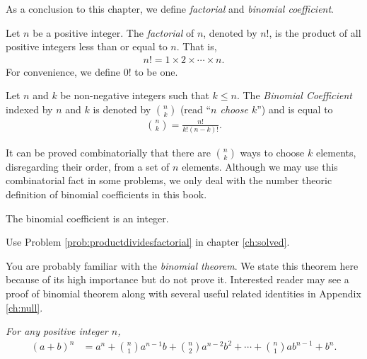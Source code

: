 \documentclass{subfile}
\begin{document}
As a conclusion to this chapter, we define \textit{factorial} and \textit{binomial coefficient}.

		\begin{definition}[Factorial]
			Let $n$ be a positive integer. The \textit{factorial} of $n$, denoted by $n!$, is the product of all positive integers less than or equal to $n$. That is,
				\begin{align*}
					n! = 1 \times 2 \times \cdots \times n.
				\end{align*}
			For convenience, we define $0!$ to be one.
		\end{definition}

		\begin{definition}
			Let $n$ and $k$ be non-negative integers such that $k \leq n$. The \textit{Binomial Coefficient} indexed by $n$ and $k$ is denoted by $\displaystyle \binom{n}{k}$ (read ``\textit{$n$ choose $k$}'') and is equal to
				\begin{align*}
					\binom{n}{k} = \frac{n!}{k!(n-k)!}.
				\end{align*}
		\end{definition}

		\begin{note}
			It can be proved combinatorially that there are $\binom{n}{k}$ ways to choose $k$ elements, disregarding their order, from a set of $n$ elements. Although we may use this combinatorial fact in some problems, we only deal with the number theoric definition of binomial coefficients in this book.
		\end{note}

		\begin{proposition}
			The binomial coefficient is an integer.
		\end{proposition}

		\begin{hint}
			Use Problem \ref{prob:productdividesfactorial} in chapter \autoref{ch:solved}.
		\end{hint}
	You are probably familiar with the \textit{binomial theorem}. We state this theorem here because of its high importance but do not prove it. Interested reader may see a proof of binomial theorem along with several useful related identities in Appendix \autoref{ch:null}.
		\begin{theorem}\slshape
			For any positive integer $n$,
				\begin{align*}
					(a+b)^n & = a^n+\binom{n}{1}a^{n-1}b+\binom{n}{2}a^{n-2}b^2+\cdots+\binom{n}{1}ab^{n-1}+b^n.
				\end{align*}
		\end{theorem}
\end{document}
